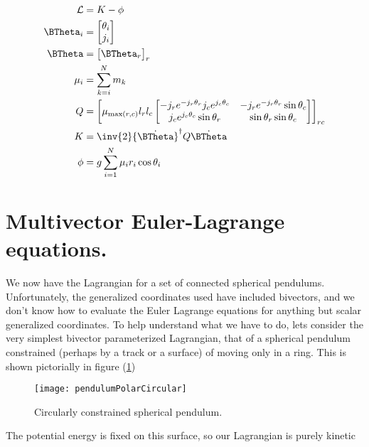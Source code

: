 \begin{align}\label{eqn:sPolarMultiPendulum:zoo20}
\LL &= K - \phi \\
\BTheta_i &=
\begin{bmatrix}
\theta_i \\
j_i
\end{bmatrix} \\
\BTheta &=
{\begin{bmatrix}
\BTheta_r
\end{bmatrix}}_{r} \\
\mu_i &=
\sum_{k=i}^N m_k \\
Q &=
{\begin{bmatrix}
\mu_{\max(r,c)}
l_r l_c
\begin{bmatrix}
- j_r e^{-j_r \theta_r} j_c e^{j_c\theta_c} & - j_r e^{-j_r \theta_r} \sin\theta_c \\
j_c e^{j_c \theta_c} \sin\theta_r & \sin\theta_r \sin\theta_c
\end{bmatrix}
\end{bmatrix}}_{rc} \\
K &=
\inv{2} {\dot{\BTheta}}^\dagger Q \dot{\BTheta} \\
\phi &=
g \sum_{i=1}^N \mu_i r_i \cos\theta_i
\end{align}

\section{Multivector Euler-Lagrange equations.}

We now have the Lagrangian for a set of connected spherical pendulums.  Unfortunately, the generalized coordinates used have included bivectors, and we don't know how to evaluate the Euler Lagrange equations for anything but scalar generalized coordinates.  To help understand what we have to do, lets consider the very simplest bivector parameterized Lagrangian, that of a spherical pendulum constrained (perhaps by a track or a surface) of moving only in a ring.  This is shown pictorially in figure (\ref{fig:sPolarMultiPendulum:pendulumPolarCircular})

\begin{figure}[htp]
\centering
\texttt{[image: pendulumPolarCircular]}
\caption{Circularly constrained spherical pendulum.}\label{fig:sPolarMultiPendulum:pendulumPolarCircular}
\end{figure}

The potential energy is fixed on this surface, so our Lagrangian is purely kinetic

